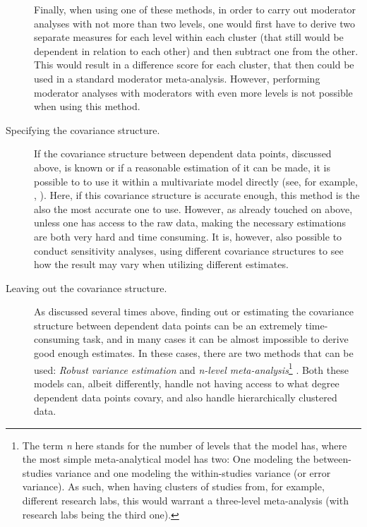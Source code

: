 \begin{description}
Finally, when using one of these methods, in order to carry out moderator analyses with not more than two levels, one would first have to derive two separate measures for each level within each cluster (that still would be dependent in relation to each other) and then subtract one from the other. This would result in a difference score for each cluster, that then could be used in a standard moderator meta-analysis. However, performing moderator analyses with moderators with even more levels is not possible when using this method.

\item [Specifying the covariance structure.] If the covariance structure between dependent data points, discussed above, is known or if a reasonable estimation of it can be made, it is possible to to use it within a multivariate model directly (see, for example, \citeauthor{Hripsime1996}, \citeyear{Hripsime1996}). Here, if this covariance structure is accurate enough, this method is the also the most accurate one to use. However, as already touched on above, unless one has access to the raw data, making the necessary estimations are both very hard and time consuming. It is, however, also possible to conduct sensitivity analyses, using different covariance structures to see how the result may vary when utilizing different estimates.

\item [Leaving out the covariance structure.] As discussed several times above, finding out or estimating the covariance structure between dependent data points can be an extremely time-consuming task, and in many cases it can be almost impossible to derive good enough estimates. In these cases, there are two methods that can be used: \emph{Robust variance estimation} \parencite{Hedges2010} and \emph{n-level meta-analysis}\footnote{The term \emph{n} here stands for the number of levels that the model has, where the most simple meta-analytical model has two: One modeling the between-studies variance and one modeling the within-studies variance (or error variance). As such, when having clusters of studies from, for example, different research labs, this would warrant a three-level meta-analysis (with research labs being the third one).} \parencite{Konstantopoulos2011}. Both these models can, albeit differently, handle not having access to what degree dependent data points covary, and also handle hierarchically clustered data. \end{description}

